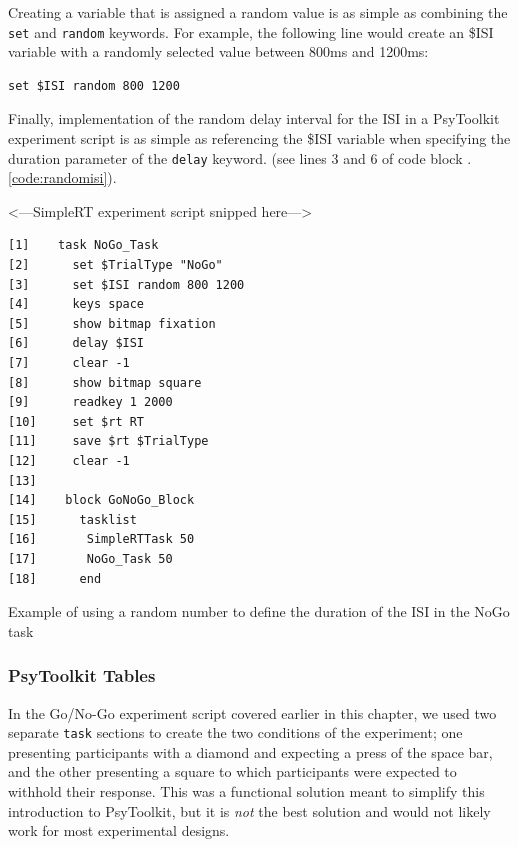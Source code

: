 Creating a variable that is assigned a random value is as simple as combining the \texttt{set} and \texttt{random} keywords.  For example, the following line would create an \$ISI variable with a randomly selected value between 800ms and 1200ms:
\begin{Verbatim}[xleftmargin=2in]
    set $ISI random 800 1200
\end{Verbatim}
Finally, implementation of the random delay interval for the ISI in a PsyToolkit experiment script is as simple as referencing the \$ISI variable when specifying the duration parameter of the \texttt{delay} keyword. (see lines 3 and 6 of code block \thechapter.\ref{code:randomisi}).

\begin{tcolorbox}[every float=\centering, drop shadow,     title=The Go/No-Go Experiment Script]
\begin{center}<---SimpleRT experiment script snipped here--->\end{center}
\begin{Verbatim}
[1]    task NoGo_Task
[2]      set $TrialType "NoGo"
[3]      set $ISI random 800 1200
[4]      keys space
[5]      show bitmap fixation
[6]      delay $ISI
[7]      clear -1
[8]      show bitmap square
[9]      readkey 1 2000
[10]     set $rt RT
[11]     save $rt $TrialType
[12]     clear -1
[13]
[14]    block GoNoGo_Block
[15]      tasklist
[16]       SimpleRTTask 50
[17]       NoGo_Task 50
[18]      end
    \end{Verbatim}
\tcblower
\begin{codeblock}{Example of using a random number to define the duration of the ISI in the NoGo task }\label{code:randomisi}\end{codeblock}
\end{tcolorbox}

\subsubsection{PsyToolkit Tables}
In the Go/No-Go experiment script covered earlier in this chapter, we used two separate \texttt{task} sections to create the two conditions of the experiment; one presenting participants with a diamond and expecting a press of the space bar, and the other presenting a square to which participants were expected to withhold their response.  This was a functional solution meant to simplify this introduction to PsyToolkit, but it is \emph{not} the best solution and would not likely work for most experimental designs.

